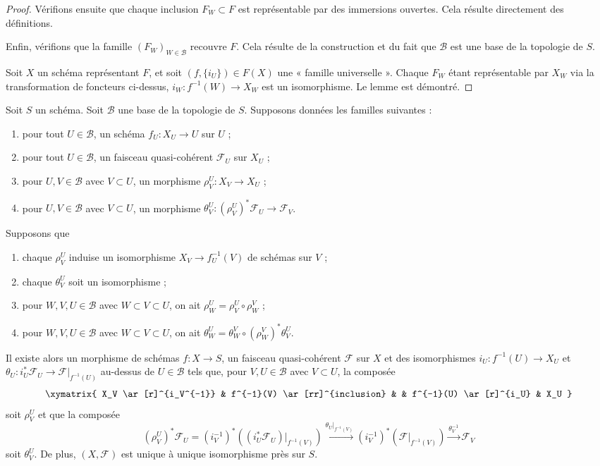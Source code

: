 \begin{proof}
\medskip\noindent
Vérifions ensuite que chaque inclusion $F_W \subset F$ est représentable
par des immersions ouvertes. Cela résulte directement des définitions.

\medskip\noindent
Enfin, vérifions que la famille $(F_W)_{W \in \mathcal{B}}$ recouvre $F$.
Cela résulte de la construction et du
fait que $\mathcal{B}$ est une base
de la topologie de $S$.

\medskip\noindent
Soit $X$ un schéma représentant $F$, et soit
$(f, \{i_U\}) \in F(X)$ une « famille universelle ».
Chaque $F_W$ étant représentable par $X_W$ via la transformation de
foncteurs ci-dessus, $i_W : f^{-1}(W) \to X_W$ est un isomorphisme.
Le lemme est démontré.
\end{proof}

\begin{lemma}
\label{lemma-relative-glueing-sheaves}
Soit $S$ un schéma. Soit $\mathcal{B}$ une base de la topologie de $S$.
Supposons données les familles suivantes :
\begin{enumerate}
\item pour tout $U \in \mathcal{B}$,
un schéma $f_U : X_U \to U$ sur $U$ ;
\item pour tout $U \in \mathcal{B}$, un faisceau quasi-cohérent
$\mathcal{F}_U$ sur $X_U$ ;
\item pour $U, V \in \mathcal{B}$ avec $V \subset U$, un morphisme
$\rho^U_V : X_V \to X_U$ ;
\item pour $U, V \in \mathcal{B}$ avec $V \subset U$, un morphisme
$\theta^U_V : (\rho^U_V)^*\mathcal{F}_U \to \mathcal{F}_V$.
\end{enumerate}
Supposons que
\begin{enumerate}
\item[(a)] chaque $\rho^U_V$ induise un isomorphisme
$X_V \to f_U^{-1}(V)$ de schémas sur $V$ ;
\item[(b)] chaque $\theta^U_V$ soit un isomorphisme ;
\item[(c)] pour $W, V, U \in \mathcal{B}$
avec $W \subset V \subset U$,
on ait $\rho^U_W = \rho^U_V \circ \rho ^V_W$ ;
\item[(d)] pour $W, V, U \in \mathcal{B}$
avec $W \subset V \subset U$,
on ait $\theta^U_W = \theta^V_W \circ (\rho^V_W)^*\theta^U_V$.
\end{enumerate}
Il existe alors un morphisme de schémas $f : X \to S$, un faisceau
quasi-cohérent $\mathcal{F}$ sur $X$ et des isomorphismes
$i_U : f^{-1}(U) \to X_U$ et
$\theta_U : i_U^*\mathcal{F}_U \to \mathcal{F}|_{f^{-1}(U)}$
au-dessus de $U \in \mathcal{B}$ tels que, pour $V, U \in \mathcal{B}$
avec $V \subset U$, la composée
$$
\xymatrix{
X_V \ar[r]^{i_V^{-1}} &
f^{-1}(V) \ar[rr]^{inclusion} & &
f^{-1}(U) \ar[r]^{i_U} &
X_U
}
$$
soit $\rho^U_V$ et que la composée
\begin{equation}
\label{equation-glue}
(\rho^U_V)^*\mathcal{F}_U
=
(i_V^{-1})^*((i_U^*\mathcal{F}_U)|_{f^{-1}(V)})
\xrightarrow{\theta_U|_{f^{-1}(V)}}
(i_V^{-1})^*(\mathcal{F}|_{f^{-1}(V)})
\xrightarrow{\theta_V^{-1}}
\mathcal{F}_V
\end{equation}
soit $\theta^U_V$. De plus, $(X, \mathcal{F})$ est unique à unique
isomorphisme près sur $S$.
\end{lemma}

